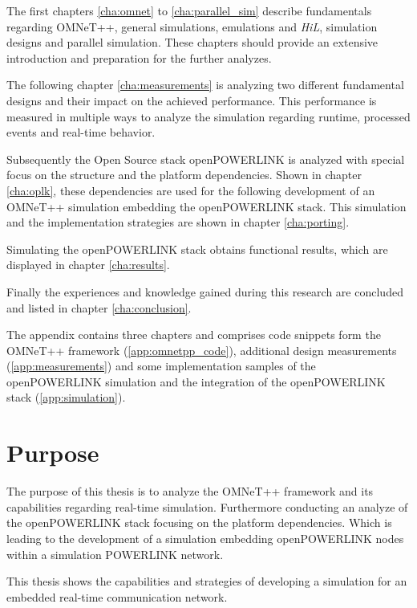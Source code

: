 The first chapters \ref{cha:omnet} to \ref{cha:parallel_sim} describe fundamentals regarding OMNeT++, general simulations, emulations and \emph{HiL}, simulation designs and parallel simulation.
These chapters should provide an extensive introduction and preparation for the further analyzes.

The following chapter \ref{cha:measurements} is analyzing two different fundamental designs and their impact on the achieved performance.
This performance is measured in multiple ways to analyze the simulation regarding runtime, processed events and real-time behavior.

Subsequently the Open Source stack openPOWERLINK is analyzed with special focus on the structure and the platform dependencies.
Shown in chapter \ref{cha:oplk}, these dependencies are used for the following development of an OMNeT++ simulation embedding the openPOWERLINK stack.
This simulation and the implementation strategies are shown in chapter \ref{cha:porting}.

Simulating the openPOWERLINK stack obtains functional results, which are displayed in chapter \ref{cha:results}.

Finally the experiences and knowledge gained during this research are concluded and listed in chapter \ref{cha:conclusion}.

The appendix contains three chapters and comprises code snippets form the OMNeT++ framework (\ref{app:omnetpp_code}), additional design measurements (\ref{app:measurements}) and some implementation samples of the openPOWERLINK simulation and the integration of the openPOWERLINK stack (\ref{app:simulation}).

\section{Purpose}
The purpose of this thesis is to analyze the OMNeT++ framework and its capabilities regarding real-time simulation.
Furthermore conducting an analyze of the openPOWERLINK stack focusing on the platform dependencies.
Which is leading to the development of a simulation embedding openPOWERLINK nodes within a simulation POWERLINK network.

This thesis shows the capabilities and strategies of developing a simulation for an embedded real-time communication network.